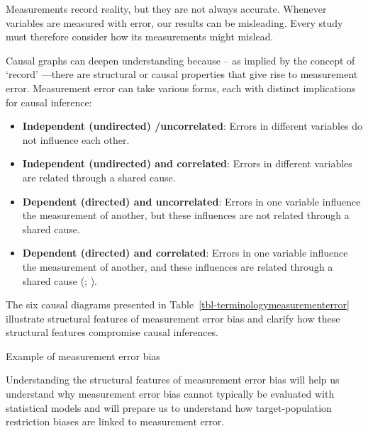 \documentclass[
  single column]{article}
\providecommand{\tightlist}{%
  \setlength{\itemsep}{0pt}\setlength{\parskip}{0pt}}\usepackage{longtable,booktabs,array}
\begin{document}
Measurements record reality, but they are not always accurate. Whenever
variables are measured with error, our results can be misleading. Every
study must therefore consider how its measurements might mislead.

Causal graphs can deepen understanding because -- as implied by the
concept of `record' ---there are structural or causal properties that
give rise to measurement error. Measurement error can take various
forms, each with distinct implications for causal inference:

\begin{itemize}
\tightlist
\item
  \textbf{Independent (undirected) /uncorrelated}: Errors in different
  variables do not influence each other.
\item
  \textbf{Independent (undirected) and correlated}: Errors in different
  variables are related through a shared cause.
\item
  \textbf{Dependent (directed) and uncorrelated}: Errors in one variable
  influence the measurement of another, but these influences are not
  related through a shared cause.
\item
  \textbf{Dependent (directed) and correlated}: Errors in one variable
  influence the measurement of another, and these influences are related
  through a shared cause (; ).
\end{itemize}

The six causal diagrams presented in
Table~\ref{tbl-terminologymeasurementerror} illustrate structural
features of measurement error bias and clarify how these structural
features compromise causal inferences.

\begin{table}

\caption{\label{tbl-terminologymeasurementerror}Example of measurement
error bias}

\centering{

\terminologymeasurementerror

}

\end{table}%

Understanding the structural features of measurement error bias will
help us understand why measurement error bias cannot typically be
evaluated with statistical models and will prepare us to understand how
target-population restriction biases are linked to measurement error.
\end{document}
